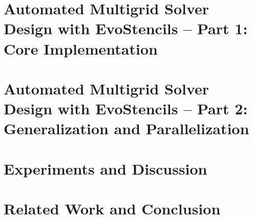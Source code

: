 \documentclass[
  paper = a5paper,
  language = english,
  acronym = nosymbol,
  acronymline = novertical,
  bibliography = combined,
  bibliographypart = all,
  titlesize = Huge,
  par = halfskip,
]{faupress}
\theoremstyle{definition}
\numberwithin{equation}{chapter}
\begin{document}
\chapter{Automated Multigrid Solver Design with EvoStencils -- Part 1: Core Implementation}
\label{chapter:evostencils-1}
  
\chapter{Automated Multigrid Solver Design with EvoStencils -- Part 2: Generalization and Parallelization}
  \label{chapter:evostencils-2}
  
\chapter{Experiments and Discussion}
\label{chapter:experiments}
  
\chapter{Related Work and Conclusion}
  
  

\appendix 


\backmatter
  \faupressprintbibliography
   \faupressprintacronyms
  \begingroup
  \listofalgorithms
  \let\clearpage\relax
  \listoflistings
  \endgroup
\end{document}
